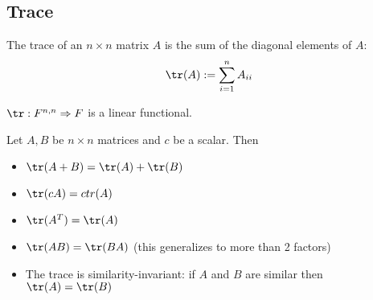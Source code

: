\subsection{Trace}

\begin{definition}
  The trace of an $n \times n$ matrix $A$ is the sum of the diagonal elements of $A$:
  \[
    \tr(A) := \sum_{i = 1}^n A_{ii}
  \]

  $\tr : F^{n,n} \Rightarrow F$ is a linear functional.
\end{definition}

\begin{theorem}
  Let $A, B$ be $n \times n$ matrices and $c$ be a scalar. Then
  \begin{itemize}
    \item $\tr(A + B) = \tr(A) + \tr(B)$
    \item $\tr(cA) = c tr(A)$
    \item $\tr(A^T) = \tr(A)$
    \item $\tr(AB) = \tr(BA)$ (this generalizes to more than 2 factors)
    \item The trace is similarity-invariant: if $A$ and $B$ are similar then $\tr(A) = \tr(B)$
  \end{itemize}
\end{theorem}




